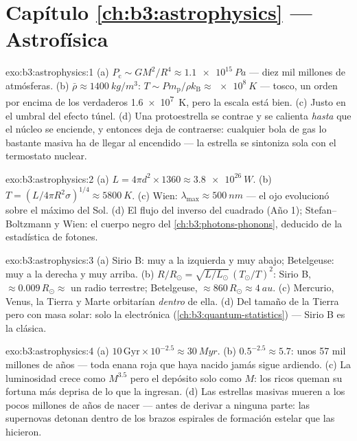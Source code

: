 \section*{Capítulo \ref{ch:b3:astrophysics} --- Astrofísica}

\begin{solution}{exo:b3:astrophysics:1}
(a) $P_{\text{c}} \sim GM^2/R^4 \approx \qty{1.1e15}{Pa}$ --- diez
mil millones de atmósferas. (b) $\bar\rho \approx \qty{1400}{kg/m^3}$:
$T \sim P m_{\text{p}}/\rho k_{\text{B}} \approx \qty{e8}{K}$ ---
tosco, un orden por encima de los verdaderos \qty{1.6e7}{K}, pero la escala está
bien. (c) Justo en el umbral del efecto túnel. (d) Una protoestrella
se contrae y se calienta \emph{hasta} que el núcleo se enciende, y entonces deja de
contraerse: cualquier bola de gas lo bastante masiva ha de llegar al encendido
--- la estrella se sintoniza sola con el termostato nuclear.
\end{solution}

\begin{solution}{exo:b3:astrophysics:2}
(a) $L = 4\pi d^2\times1360 \approx \qty{3.8e26}{W}$. (b) $T =
(L/4\pi R^2\sigma)^{1/4} \approx \qty{5800}{K}$. (c) Wien:
$\lambda_{\text{max}} \approx \qty{500}{nm}$ --- el ojo evolucionó
sobre el máximo del Sol. (d) El flujo del inverso del cuadrado (Año 1);
Stefan--Boltzmann y Wien: el cuerpo negro del \cref{ch:b3:photons-phonons},
deducido de la estadística de fotones.
\end{solution}

\begin{solution}{exo:b3:astrophysics:3}
(a) Sirio B: muy a la izquierda y muy abajo; Betelgeuse: muy a la derecha y muy arriba.
(b) $R/R_\odot = \sqrt{L/L_\odot}\,(T_\odot/T)^2$: Sirio B,
$\approx 0.009\,R_\odot \approx$ un radio terrestre; Betelgeuse,
$\approx 860\,R_\odot \approx \qty{4}{au}$. (c) Mercurio, Venus,
la Tierra y Marte orbitarían \emph{dentro} de ella. (d) Del tamaño de la Tierra pero
con masa solar: solo la  electrónica
(\cref{ch:b3:quantum-statistics}) --- Sirio B es la 
clásica.
\end{solution}

\begin{solution}{exo:b3:astrophysics:4}
(a) $10\,\text{Gyr}\times10^{-2.5} \approx \qty{30}{Myr}$. (b)
$0.5^{-2.5} \approx 5.7$: unos 57 mil millones de años --- toda enana
roja que haya nacido jamás sigue ardiendo. (c) La luminosidad crece como
$M^{3.5}$ pero el depósito solo como $M$: los ricos queman su fortuna
más deprisa de lo que la ingresan. (d) Las estrellas masivas mueren a los pocos
millones de años de nacer --- antes de derivar a ninguna parte: las supernovas
detonan dentro de los brazos espirales de formación estelar que las hicieron.
\end{solution}

